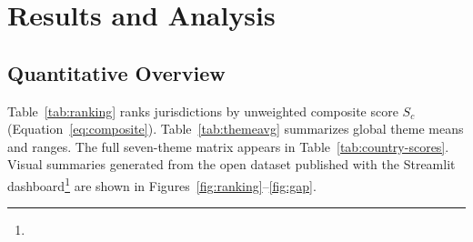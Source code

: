 \chapter{Results and Analysis}
\label{ch:results}

\section{Quantitative Overview}
\label{sec:quant}

Table~\ref{tab:ranking} ranks jurisdictions by unweighted composite score $S_c$ (Equation~\eqref{eq:composite}). Table~\ref{tab:themeavg} summarizes global theme means and ranges. The full seven-theme matrix appears in Table~\ref{tab:country-scores}. Visual summaries generated from the open dataset published with the Streamlit dashboard\footnote{\repoLink{}} are shown in Figures~\ref{fig:ranking}--\ref{fig:gap}.

